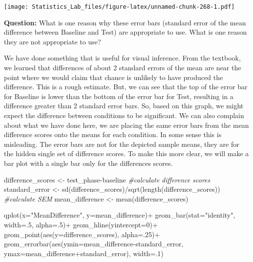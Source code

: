 \documentclass[
]{book}
\newenvironment{Shaded}{\begin{snugshade}}{\end{snugshade}}
\newcommand{\AttributeTok}[1]{\textcolor[rgb]{0.77,0.63,0.00}{#1}}
\newcommand{\CommentTok}[1]{\textcolor[rgb]{0.56,0.35,0.01}{\textit{#1}}}
\newcommand{\DecValTok}[1]{\textcolor[rgb]{0.00,0.00,0.81}{#1}}
\newcommand{\FunctionTok}[1]{\textcolor[rgb]{0.00,0.00,0.00}{#1}}
\newcommand{\NormalTok}[1]{#1}
\newcommand{\OtherTok}[1]{\textcolor[rgb]{0.56,0.35,0.01}{#1}}
\newcommand{\SpecialCharTok}[1]{\textcolor[rgb]{0.00,0.00,0.00}{#1}}
\newcommand{\StringTok}[1]{\textcolor[rgb]{0.31,0.60,0.02}{#1}}
\begin{document}
\texttt{[image: Statistics\_Lab\_files/figure-latex/unnamed-chunk-268-1.pdf]}

\textbf{Question:} What is one reason why these error bars (standard error of the mean difference between Baseline and Test) are appropriate to use. What is one reason they are not appropriate to use?

We have done something that is useful for visual inference. From the textbook, we learned that differences of about 2 standard errors of the mean are near the point where we would claim that chance is unlikely to have produced the difference. This is a rough estimate. But, we can see that the top of the error bar for Baseline is lower than the bottom of the error bar for Test, resulting in a difference greater than 2 standard error bars. So, based on this graph, we might expect the difference between conditions to be significant. We can also complain about what we have done here, we are placing the same error bars from the mean difference scores onto the means for each condition. In some sense this is misleading. The error bars are not for the depicted sample means, they are for the hidden single set of difference scores. To make this more clear, we will make a bar plot with a single bar only for the differences scores.

\begin{Shaded}
\begin{Highlighting}[]
\NormalTok{difference\_scores }\OtherTok{\textless{}{-}}\NormalTok{ test\_phase}\SpecialCharTok{{-}}\NormalTok{baseline }\CommentTok{\#calculate difference scores}
\NormalTok{standard\_error }\OtherTok{\textless{}{-}} \FunctionTok{sd}\NormalTok{(difference\_scores)}\SpecialCharTok{/}\FunctionTok{sqrt}\NormalTok{(}\FunctionTok{length}\NormalTok{(difference\_scores)) }\CommentTok{\#calculate SEM}
\NormalTok{mean\_difference }\OtherTok{\textless{}{-}} \FunctionTok{mean}\NormalTok{(difference\_scores)}

\FunctionTok{qplot}\NormalTok{(}\AttributeTok{x=}\StringTok{"MeanDifference"}\NormalTok{, }\AttributeTok{y=}\NormalTok{mean\_difference)}\SpecialCharTok{+}
  \FunctionTok{geom\_bar}\NormalTok{(}\AttributeTok{stat=}\StringTok{"identity"}\NormalTok{, }\AttributeTok{width=}\NormalTok{.}\DecValTok{5}\NormalTok{, }\AttributeTok{alpha=}\NormalTok{.}\DecValTok{5}\NormalTok{)}\SpecialCharTok{+}
  \FunctionTok{geom\_hline}\NormalTok{(}\AttributeTok{yintercept=}\DecValTok{0}\NormalTok{)}\SpecialCharTok{+}
  \FunctionTok{geom\_point}\NormalTok{(}\FunctionTok{aes}\NormalTok{(}\AttributeTok{y=}\NormalTok{difference\_scores), }\AttributeTok{alpha=}\NormalTok{.}\DecValTok{25}\NormalTok{)}\SpecialCharTok{+}
  \FunctionTok{geom\_errorbar}\NormalTok{(}\FunctionTok{aes}\NormalTok{(}\AttributeTok{ymin=}\NormalTok{mean\_difference}\SpecialCharTok{{-}}\NormalTok{standard\_error, }
                                  \AttributeTok{ymax=}\NormalTok{mean\_difference}\SpecialCharTok{+}\NormalTok{standard\_error), }\AttributeTok{width=}\NormalTok{.}\DecValTok{1}\NormalTok{)}
\end{Highlighting}
\end{Shaded}
\end{document}
